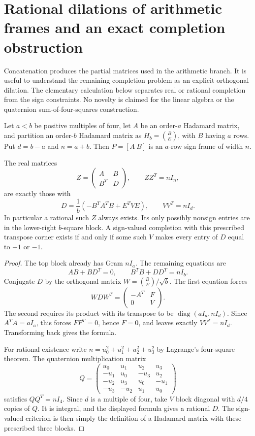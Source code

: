 \section{Rational dilations of arithmetic frames and an exact completion obstruction}
\label{sec:rational-dilations}

Concatenation produces the partial matrices used in the arithmetic
branch. It is useful to understand the remaining completion problem
as an explicit orthogonal dilation. The elementary calculation below
separates real or rational completion from the sign constraints.
No novelty is claimed for the linear algebra or the quaternion
sum-of-four-squares construction.

Let $a<b$ be positive multiples of four, let $A$ be an order-$a$
Hadamard matrix, and partition an order-$b$ Hadamard matrix as
$H_b=\binom{B}{E}$, with $B$ having $a$ rows. Put $d=b-a$ and $n=a+b$.
Then $P=[A\ B]$ is an $a$-row sign frame of width $n$.

\begin{theorem}
\label{dil:parameterization}
The real matrices
\[
 Z=\begin{pmatrix}A&B\\B^T&D\end{pmatrix},\qquad ZZ^T=nI_n,
\]
are exactly those with
\[
 \boxed{D=\frac1b\left(-B^TA^TB+E^TVE\right),\qquad
                         VV^T=nI_d.}
\]
In particular a rational such $Z$ always exists. Its only possibly
nonsign entries are in the lower-right $b$-square block.
A sign-valued completion with this prescribed transpose corner
exists if and only if some such $V$ makes every entry of $D$ equal
to $+1$ or $-1$.
\end{theorem}
\begin{proof}
The top block already has Gram $nI_a$. The remaining equations are
\[
 AB+BD^T=0,\qquad B^TB+DD^T=nI_b.
\]
Conjugate $D$ by the orthogonal matrix
$W=\binom{B}{E}/\sqrt b$. The first equation forces
\[
 WDW^T=\begin{pmatrix}-A^T&F\\0&V\end{pmatrix}.
\]
The second requires its product with its transpose to be
$\operatorname{diag}(aI_a,nI_d)$.
Since $A^TA=aI_a$, this forces $FF^T=0$, hence $F=0$,
and leaves exactly $VV^T=nI_d$. Transforming back gives the formula.

For rational existence write $n=u_0^2+u_1^2+u_2^2+u_3^2$ by
Lagrange's four-square theorem. The quaternion multiplication matrix
\[
 Q=\begin{pmatrix}
 u_0&u_1&u_2&u_3\\
 -u_1&u_0&-u_3&u_2\\
 -u_2&u_3&u_0&-u_1\\
 -u_3&-u_2&u_1&u_0
 \end{pmatrix}
\]
satisfies $QQ^T=nI_4$. Since $d$ is a multiple of four, take $V$
block diagonal with $d/4$ copies of $Q$. It is integral, and the
displayed formula gives a rational $D$. The sign-valued criterion
is then simply the definition of a Hadamard matrix with these
prescribed three blocks.
\end{proof}

